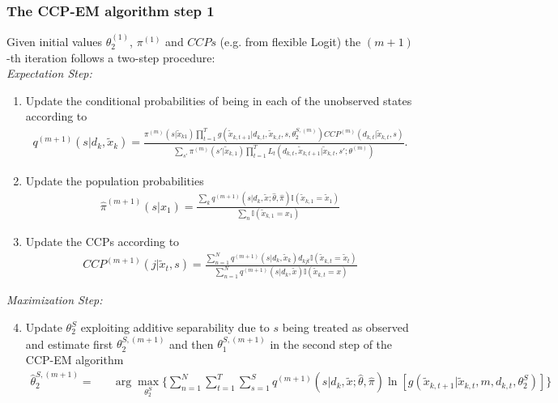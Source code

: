 \subsubsection{The CCP-EM algorithm step 1}
Given initial values $\theta_2^{(1)}$, $\pi^{(1)}$ and $CCPs$ (e.g. from flexible Logit) the $(m+1)$-th iteration follows a two-step procedure: \\
\textit{Expectation Step:}
\begin{enumerate}
\item Update the conditional probabilities of being in each of the unobserved states according to
\begin{align}
q^{(m+1)}(s|d_k,\tilde{x}_k)=\frac{\pi^{(m)}(s|\tilde{x}_{k1})\prod_{t=1}^T{g(\tilde{x}_{k,t+1}|d_{k,t},\tilde{x}_{k,t},s,\theta_2^{S,(m)})CCP^{(m)}(d_{k,t}|\tilde{x}_{k,t},s)} }{\sum_{s'}\pi^{(m)}(s'|\tilde{x}_{k,1})\prod_{t=1}^T{L_t(d_{k,t},\tilde{x}_{k,t+1}|\tilde{x}_{k,t},s';\theta^{(m)})}}.
\label{eq:qest}
\end{align}
\item Update the population probabilities
\begin{align}
\hat{\pi}^{(m+1)}(s|x_1)=\frac{\sum_k{q^{(m+1)}(s|d_k,\tilde{x};\hat{\theta},\hat{\pi})\mathbb{I}{(\tilde{x}_{k,1}=\tilde{x}_1)}}}{\sum_{n}{\mathbb{I}{(\tilde{x}_{k,1}=x_1)}}}
\label{eq:piest}
\end{align}
\item Update the CCPs according to
\begin{align}
CCP^{(m+1)}(j|\tilde{x}_t,s)=\frac{\sum_{n=1}^N{q^{(m+1)}(s|d_k,\tilde{x}_k)d_{kjt}\mathbb{I}{(\tilde{x}_{k,t}=\tilde{x}_t)}}}{\sum_{n=1}^N{q^{(m+1)}(s|d_k,\tilde{x})\mathbb{I}{(\tilde{x}_{k,t}=x)}}}
\label{eq:ccpest}
\end{align}
\end{enumerate}
\textit{Maximization Step:}
\begin{enumerate}
\setcounter{enumi}{3}
\item Update $\theta^S_2$ exploiting additive separability due to $s$ being treated as observed and estimate first $\theta_2^{S,(m+1)}$ and then $\theta_1^{S,(m+1)}$ in the second step of the CCP-EM algorithm
\begin{align}
\hat{\theta}^{S,(m+1)}_2=&&\arg\max_{\theta_2^S}{ \{\sum_{n=1}^N{\sum_{t=1}^T\sum_{s=1}^{S}{{q^{(m+1)}(s|d_k,\tilde{x};\hat{\theta},\hat{\pi})\ln[g(\tilde{x}_{k,t+1}|\tilde{x}_{k,t},m,d_{k,t},\theta_2^S)] }}}\}}
\label{eq:theta2est}
\end{align}
\end{enumerate}
